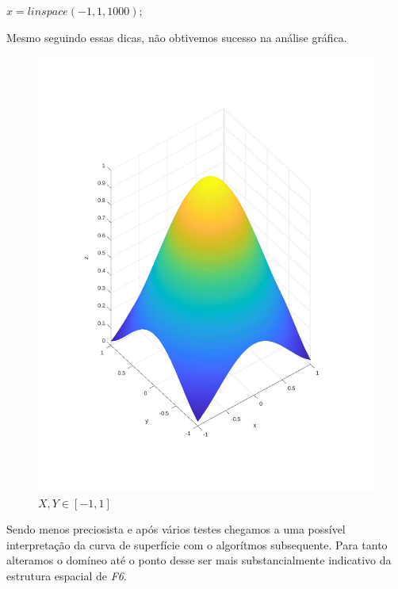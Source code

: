 \documentclass{article}
\begin{document}
$x = linspace(-1, 1, 1000);$



\newpage
\begin{flushleft}
	Mesmo seguindo essas dicas, não obtivemos sucesso na análise
	gráfica.
\end{flushleft}

\begin{figure}[h!]
\centering
\includegraphics[scale=.5]{images/myplot4.pdf}
\caption{$X,Y \in [-1, 1]$}
\label{fig:plot4_f6}
\end{figure}

\begin{flushleft}
	Sendo menos preciosista e após vários testes chegamos a uma
	possível interpretação da curva de superfície com o algorítmos
	subsequente. Para tanto alteramos o domíneo até o ponto desse
	ser mais substancialmente indicativo da estrutura espacial de
	\emph{F6}.
\end{flushleft}
\end{document}
